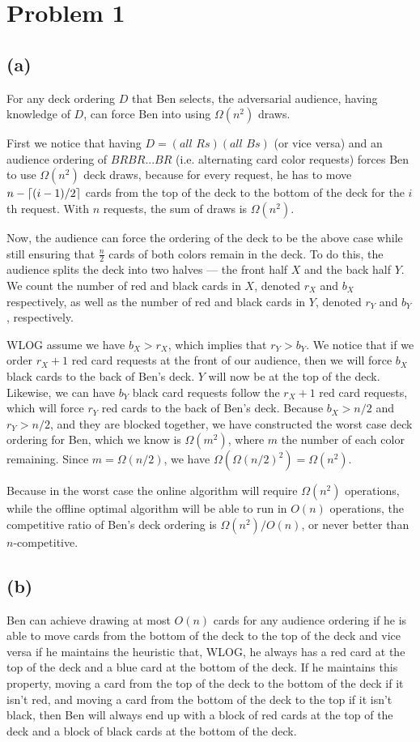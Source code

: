 \documentclass{6046}
\author{Matthew Feng}
\begin{document}
\section*{Problem 1}
\subsection*{(a)}

For any deck ordering $D$ that Ben selects, the adversarial
audience, having knowledge of $D$, can force Ben into using
$\Omega(n^2)$ draws.

First we notice that having $D = (\textit{all Rs})(\textit{all Bs})$
(or vice versa) and an audience ordering of $BRBR...BR$ (i.e. alternating
card color requests) forces Ben to use $\Omega(n^2)$ deck draws,
because for every request, he has to move $n - \left\lceil (i - 1) / 2 \right\rceil$ cards from
the top of the deck to the bottom of the deck for the $i$th
request. With $n$ requests, the sum of draws is $\Omega(n^2)$.

Now, the audience can force the ordering of the deck to be the
above case while still ensuring that $\frac{n}{2}$ cards of 
both colors remain in the deck. To do this, the audience
splits the deck into two halves --- the front half $X$ and
the back half $Y$. We count the number of red and black cards
in $X$, denoted $r_X$ and $b_X$ respectively, as well as
the number of red and black cards in $Y$, denoted $r_Y$ and $b_Y$,
respectively.

WLOG assume we have $b_X > r_X$, which implies that $r_Y > b_Y$.
We notice that if we order $r_X + 1$ red card requests
at the front of our audience, then we will force $b_X$ black cards to the back of
Ben's deck. $Y$ will now be at the top of the deck. Likewise,
we can have $b_Y$ black card requests follow the $r_X + 1$
red card requests, which will force $r_Y$ red cards to the
back of Ben's deck. Because $b_X > n / 2$ and $r_Y > n / 2$,
and they are blocked together, we have constructed the worst case
deck ordering for Ben, which we know is $\Omega(m^2)$, where $m$
the number of each color remaining. Since $m = \Omega(n / 2)$, we
have $\Omega(\Omega(n / 2) ^ 2) = \Omega(n^2)$.

Because in the worst case the online algorithm will
require $\Omega(n^2)$ operations, while the offline
optimal algorithm will be able to run in $O(n)$
operations, the competitive ratio of Ben's
deck ordering is $\Omega(n^2) / O(n)$, or never
better than $n$-competitive.

\subsection*{(b)}
Ben can achieve drawing at most $O(n)$ cards for any audience
ordering if he is able to move cards from the bottom of the
deck to the top of the deck and vice versa if he maintains
the heuristic that, WLOG, he always has a red card at the top
of the deck and a blue card at the bottom of the deck. If he
maintains this property, moving a card from the top of the deck
to the bottom of the deck if it isn't red, and moving a card
from the bottom of the deck to the top if it isn't black, then
Ben will always end up with a block of red cards at the top
of the deck and a block of black cards at the bottom of the deck.
\end{document}
